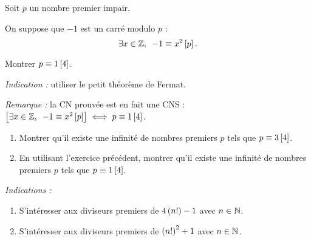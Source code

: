 \begin{corr}
\end{corr}

\begin{exo}
Soit \(p\) un nombre premier impair.

On suppose que \(-1\) est un carré modulo \(p\) : \[\quantifs{\exists x\in\Z}-1\equiv x^2\croch{p}.\]

Montrer \(p\equiv1\left[4\right]\).

\textit{Indication :} utiliser le petit théorème de Fermat.

{\small \textit{Remarque :} la CN prouvée est en fait une CNS : \(\croch{\quantifs{\exists x\in\Z}-1\equiv x^2\croch{p}}\ssi p\equiv1\croch{4}\).}
\end{exo}

\begin{corr}
\end{corr}

\begin{exo}
\begin{enumerate}
\item Montrer qu'il existe une infinité de nombres premiers \(p\) tels que \(p\equiv3\left[4\right]\). \\

\item En utilisant l'exercice précédent, montrer qu'il existe une infinité de nombres premiers \(p\) tels que \(p\equiv1\left[4\right]\).
\end{enumerate}

\textit{Indications :}

\begin{enumerate}
\item S'intéresser aux diviseurs premiers de \(4\left(n!\right)-1\) avec \(n\in\mathbb{N}\). \\

\item S'intéresser aux diviseurs premiers de \(\left(n!\right)^2+1\) avec \(n\in\mathbb{N}\).
\end{enumerate}
\end{exo}

\begin{corr}
\end{corr}